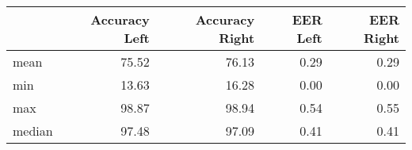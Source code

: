 \begin{tabular}{lrrrr}
\toprule
{} &  Accuracy Left &  Accuracy Right &  EER Left &  EER Right \\
\midrule
mean   &          75.52 &           76.13 &      0.29 &       0.29 \\
min    &          13.63 &           16.28 &      0.00 &       0.00 \\
max    &          98.87 &           98.94 &      0.54 &       0.55 \\
median &          97.48 &           97.09 &      0.41 &       0.41 \\
\bottomrule
\end{tabular}
